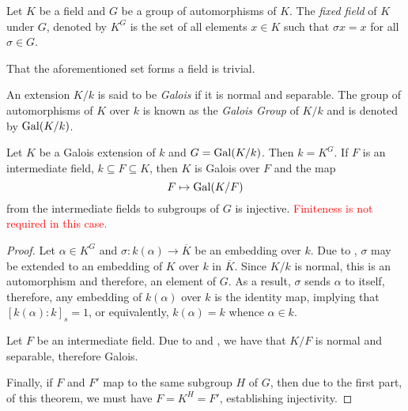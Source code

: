 \begin{definition}
    Let $K$ be a field and $G$ be a group of automorphisms of $K$. The \textit{fixed field} of $K$ under $G$, denoted by $K^G$ is the set of all elements $x\in K$ such that $\sigma x = x$ for all $\sigma\in G$.
\end{definition}

That the aforementioned set forms a field is trivial.

\begin{definition}
    An extension $K/k$ is said to be \textit{Galois} if it is normal and separable. The group of automorphisms of $K$ over $k$ is known as the \textit{Galois Group} of $K/k$ and is denoted by $\operatorname{Gal}(K/k)$.
\end{definition}

\begin{theorem}
    Let $K$ be a Galois extension of $k$ and $G = \operatorname{Gal}(K/k)$. Then $k = K^G$. If $F$ is an intermediate field, $k\subseteq F\subseteq K$, then $K$ is Galois over $F$ and the map 
    \begin{equation*}
        F\mapsto\operatorname{Gal}(K/F)
    \end{equation*}
    from the intermediate fields to subgroups of $G$ is injective.
    \textcolor{red}{Finiteness is not required in this case.}
\end{theorem}
\begin{proof}
    Let $\alpha\in K^G$ and $\sigma: k(\alpha)\to\overline{K}$ be an embedding over $k$. Due to , $\sigma$ may be extended to an embedding of $K$ over $k$ in $\overline{K}$. Since $K/k$ is normal, this is an automorphism and therefore, an element of $G$. As a result, $\sigma$ sends $\alpha$ to itself, therefore, any embedding of $k(\alpha)$ over $k$ is the identity map, implying that $[k(\alpha):k]_s = 1$, or equivalently, $k(\alpha) = k$ whence $\alpha\in k$.

    Let $F$ be an intermediate field. Due to  and , we have that $K/F$ is normal and separable, therefore Galois.

    Finally, if $F$ and $F'$ map to the same subgroup $H$ of $G$, then due to the first part, of this theorem, we must have $F = K^H = F'$, establishing injectivity.
\end{proof}

